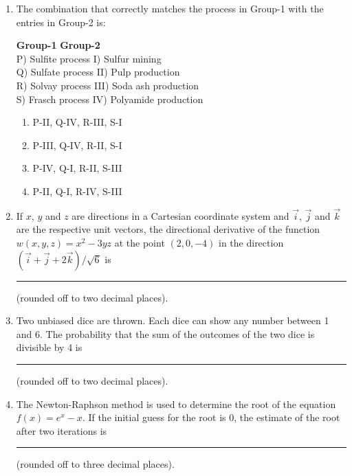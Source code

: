 \documentclass[12pt]{article}
\begin{document}
\begin{enumerate}[label=Q.\arabic*]
		\item The combination that correctly matches the process in Group-1 with the entries in Group-2 is:

			\begin{center}
				\textbf{Group-1} \hspace{3cm} \textbf{Group-2} \\
				P) Sulfite process \hspace{2.3cm} I) Sulfur mining \\
				Q) Sulfate process \hspace{2.3cm} II) Pulp production \\
				R) Solvay process \hspace{2.3cm} III) Soda ash production \\
				S) Frasch process \hspace{2.3cm} IV) Polyamide production
			\end{center}

			\begin{multicols}{2}
				\begin{enumerate}[label=(\Alph*)]
					\item P-II, Q-IV, R-III, S-I
					\item P-III, Q-IV, R-II, S-I
					\item P-IV, Q-I, R-II, S-III
					\item P-II, Q-I, R-IV, S-III
				\end{enumerate}
			\end{multicols}

		\item If $x$, $y$ and $z$ are directions in a Cartesian coordinate system and $\vec{i}$, $\vec{j}$ and $\vec{k}$ are the respective unit vectors, the directional derivative of the function $w(x,y,z) = x^2 - 3yz$ at the point $(2,0,-4)$ in the direction $(\vec{i} + \vec{j} + 2\vec{k})/\sqrt{6}$ is \rule{3cm}{0.15mm} (rounded off to two decimal places).

		\item Two unbiased dice are thrown. Each dice can show any number between 1 and 6. The probability that the sum of the outcomes of the two dice is divisible by 4 is \rule{3cm}{0.15mm} (rounded off to two decimal places).

		\item The Newton-Raphson method is used to determine the root of the equation $f(x) = e^x - x$. If the initial guess for the root is 0, the estimate of the root after two iterations is \rule{3cm}{0.15mm} (rounded off to three decimal places).


\end{enumerate}
\end{document}
